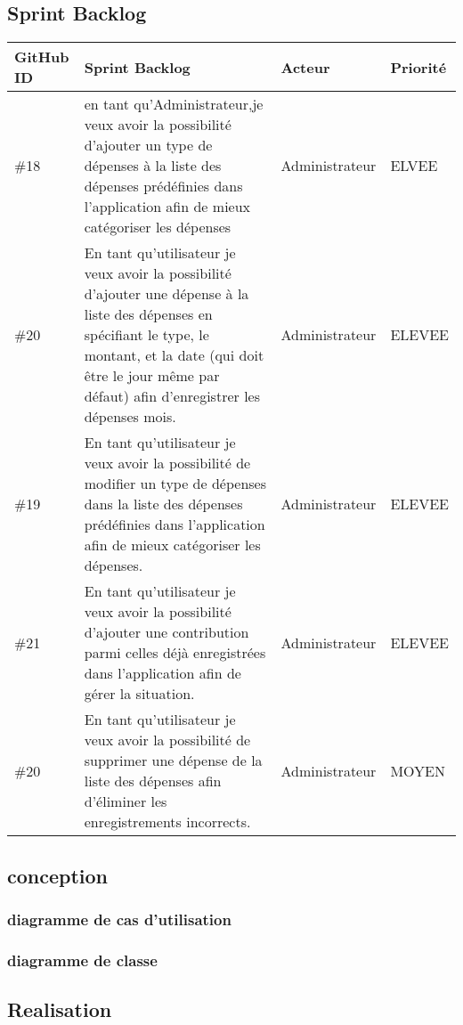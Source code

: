 \subsection{Sprint Backlog}
\begin{center}
  \begin{tabular}{ | m{1cm} | m{9cm}| m{2cm} | m{2cm} |} 
   \hline
   GitHub ID & Sprint Backlog & Acteur & Priorité \\ [0.5ex] 
   \hline\hline
   \#18 & en tant qu'Administrateur,je veux avoir la possibilité d'ajouter un type de dépenses à la liste des dépenses prédéfinies dans l'application afin de mieux catégoriser les dépenses& Administrateur & ELVEE \\ 
   \hline
   \#20  & En tant qu'utilisateur je veux avoir la possibilité d'ajouter une dépense à la liste des dépenses en spécifiant le type, le montant, et la date (qui doit être le jour même par défaut) afin d'enregistrer les dépenses mois. & Administrateur & ELEVEE \\
   \hline
   \#19  & En tant qu'utilisateur je veux avoir la possibilité de modifier un type de dépenses dans la liste des dépenses prédéfinies dans l'application afin de mieux catégoriser les dépenses. & Administrateur & ELEVEE \\
   \hline
   \#21  & En tant qu'utilisateur je veux avoir la possibilité d'ajouter une contribution parmi celles déjà enregistrées dans l'application afin de gérer la situation. & Administrateur & ELEVEE \\
   \hline
   \#20  & En tant qu'utilisateur je veux avoir la possibilité de supprimer une dépense de la liste des dépenses afin d'éliminer les enregistrements incorrects. & Administrateur & MOYEN \\
   \hline
  \end{tabular}
\end{center}
\subsection{conception}
\subsubsection{diagramme de cas d'utilisation}

\subsubsection{diagramme de classe}

\subsection{Realisation}
